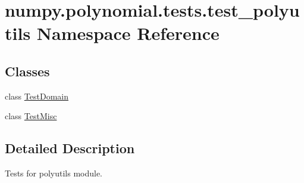 \hypertarget{namespacenumpy_1_1polynomial_1_1tests_1_1test__polyutils}{}\section{numpy.\+polynomial.\+tests.\+test\+\_\+polyutils Namespace Reference}
\label{namespacenumpy_1_1polynomial_1_1tests_1_1test__polyutils}
\subsection*{Classes}
\begin{DoxyCompactItemize}
\item 
class \hyperlink{classnumpy_1_1polynomial_1_1tests_1_1test__polyutils_1_1TestDomain}{Test\+Domain}
\item 
class \hyperlink{classnumpy_1_1polynomial_1_1tests_1_1test__polyutils_1_1TestMisc}{Test\+Misc}
\end{DoxyCompactItemize}


\subsection{Detailed Description}
\begin{DoxyVerb}Tests for polyutils module.\end{DoxyVerb}
 